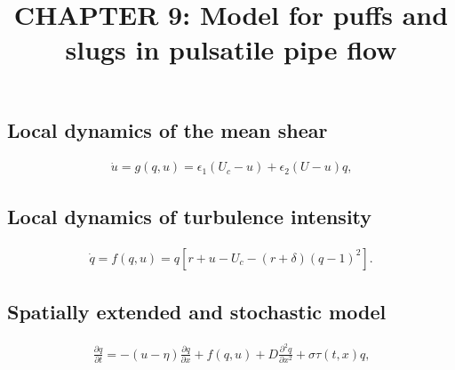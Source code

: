 \documentclass{article}
\title{CHAPTER 9: Model for puffs and slugs in pulsatile pipe flow}
\date{}
\begin{document}
\maketitle




\subsection{Local dynamics of the mean shear}
\begin{align}
\dot{u}=g\left(q,u\right)= \epsilon_{1} \left(U_{c}-u \right) + \epsilon_{2} \left(U-u \right)q \text{,}
\label{eq:loc_u}
\end{align}


\subsection{Local dynamics of turbulence intensity}
\begin{align}
\dot{q}=f\left(q,u\right)=q \left[r+u-U_{c}-\left(r+\delta \right) \left(q -1 \right)^{2} \right]\text{.}
\label{eq:loc_q}
\end{align}


\subsection{Spatially extended and stochastic model}
\begin{align}
\frac{\partial q}{\partial t}=-\left(u-\eta \right)\frac{\partial q}{\partial x} + f\left(q,u \right) + D\frac{\partial^{2} q}{\partial x^{2}} + \sigma \tau \left(t,x\right) q \text{,}
\label{eq:SPDE_q}
\end{align}
\end{document}
